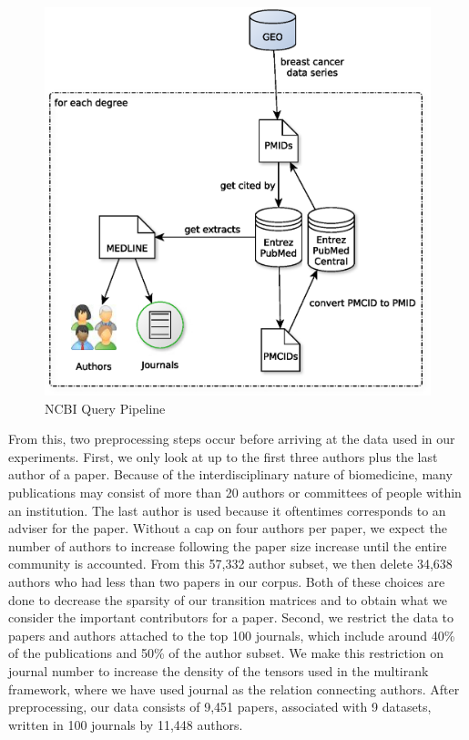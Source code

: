 \begin{figure}[h]
    \includegraphics[width=\columnwidth]{ncbi_pipeline.eps}
    \caption{NCBI Query Pipeline}
    \label{fig:pipeline}
\end{figure}

From this, two preprocessing steps occur before arriving at the data used in our experiments. First, we only look at up to the first three authors plus the last author of a paper. Because of the interdisciplinary nature of biomedicine, many publications may consist of more than 20 authors or committees of people within an institution. The last author is used because it oftentimes corresponds to an adviser for the paper. Without a cap on four authors per paper, we expect the number of authors to increase following the paper size increase until the entire community is accounted. From this 57,332 author subset, we then delete 34,638 authors who had less than two papers in our corpus. Both of these choices are done to decrease the sparsity of our transition matrices and to obtain what we consider the important contributors for a paper. Second, we restrict the data to papers and authors attached to the top 100 journals, which include around 40\% of the publications and 50\% of the author subset. We make this restriction on journal number to increase the density of the tensors used in the multirank framework, where we have used journal as the relation connecting authors. After preprocessing, our data consists of 9,451 papers, associated with 9 datasets, written in 100 journals by 11,448 authors.

